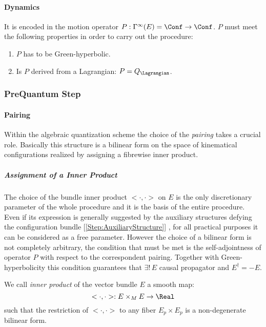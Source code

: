 \documentclass[Main]{subfiles}
\begin{document}
   		\paragraph{Dynamics}
		It is encoded in the motion operator $P: \Gamma^\infty (E)= \Conf \rightarrow \Conf$.
   		$P$ must meet the following properties in order to carry out the procedure:
   				   	\begin{enumerate}
   						\item $P$ has to be Green-hyperbolic.%
   						\item Is $P$ derived from a Lagrangian: $P=Q_\Lagrangian$.%
   					\end{enumerate}
   					
	\subsubsection{PreQuantum Step}%
		\paragraph{Pairing}\label{Paragraph:Pairing Construction}
				Within the algebraic quantization scheme the choice of the \emph{pairing} takes a crucial role.
				Basically this structure is a bilinear form on the space of kinematical configurations realized by assigning a fibrewise inner product.

			\subparagraph{Assignment of a Inner Product}
				The choice of the bundle inner product  $<\cdot,\cdot>$ on $E$ is the only discretionary parameter of the whole procedure and it is the basis of the entire procedure.\\
				Even if its expression is generally suggested by the auxiliary structures defying the configuration bundle [\ref{Step:AuxiliaryStructure}] , for all practical purposes it can be considered as a free parameter.
				However the choice of a bilinear form is not completely arbitrary, the condition that must be met is the self-adjointness of operator $P$ with respect to the correspondent pairing.				
				Together with Green-hyperbolicity this condition guarantees that $\exists ! \, E$ causal propagator and $E^\dagger =  -E$.
			\begin{definition}%
				We call \emph{inner product} of the vector bundle $E$ a smooth map:
				\begin{displaymath}
					<\cdot,\cdot> : E \times_M E \rightarrow \Real
				\end{displaymath}
				such that the restriction of $<\cdot,\cdot>$ to any fiber $E_p\times E_p$ is a non-degenerate bilinear form.
			\end{definition}
\end{document}
